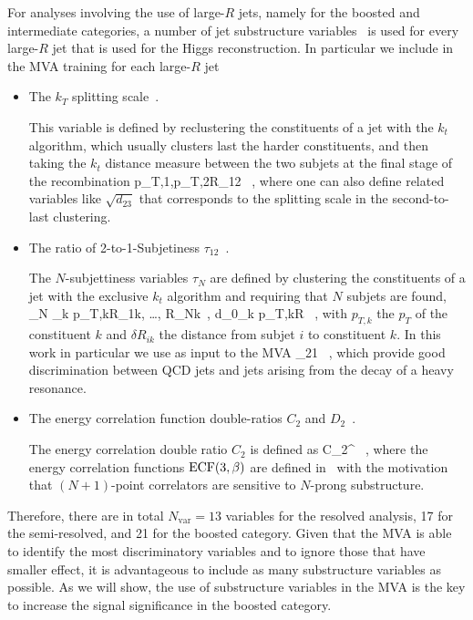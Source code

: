 For analyses involving the use of large-$R$ jets,
namely for the boosted and intermediate categories,
a number of jet substructure variables~\cite{Aad:2013gja} is used
for every large-$R$ jet that is used for the Higgs reconstruction.
%
In particular we include in the MVA training for each large-$R$ jet
\begin{itemize}
\item The $k_T$ splitting scale~\cite{Butterworth:2002tt,Butterworth:2008iy}.

  This variable is defined by reclustering the constituents of a jet with the
  $k_t$ algorithm, which usually clusters last the harder constituents, and then
  taking the $k_t$ distance measure between the two subjets at the final stage of the recombination
  \be
{} \lp p_{T,1},p_{T,2}\rp \cdot \Delta R_{12} \, ,
\ee
where one can also define related variables like $\sqrt{d_{23}}$ that corresponds to the
splitting scale in the second-to-last clustering.
  
\item The ratio of 2-to-1-Subjetiness $\tau_{12}$~\cite{Thaler:2010tr,Thaler:2011gf}.

  The $N$-subjettiness variables $\tau_N$ are defined by clustering the constituents
  of a jet with the exclusive $k_t$ algorithm and requiring that $N$ subjets are found,
  \be
  \tau_N \equiv {} \sum_k p_{T,k}\lp \delta R_{1k}, \ldots,
  \delta R_{Nk}\rp \, , \qquad d_0\equiv \sum_k p_{T,k}\cdot R \, ,
  \ee
  with $ p_{T,k}$ the $p_T$ of the constituent $k$ and $\delta R_{ik}$ the distance from
  subjet $i$ to constituent $k$.
  In this work in particular we use as input to the MVA
  \be
\tau_{21} \equiv {} \, ,
  \ee
  which provide good discrimination between QCD jets and jets arising from the decay of
  a heavy resonance.
  
\item The energy correlation function double-ratios $C_2$ and $D_2$~\cite{Larkoski:2013eya}.

  The energy correlation double ratio $C_2$ is defined
  as
  \be
C_2^{\beta} \equiv {} \, ,
  \ee
  where the energy correlation functions ${\rm ECF}(3,\beta)$ are defined
  in~\cite{Larkoski:2013eya} with the motivation that $(N+1)$-point correlators
  are sensitive to $N$-prong substructure.

\end{itemize}
%
Therefore, there are in total $N_{\mathrm{var}}=13$ variables for the resolved analysis,
17 for the semi-resolved, and 21 for the boosted category.
%
Given that the MVA is able to identify the most discriminatory variables
and to ignore those that have smaller effect, it is advantageous to
include as many substructure variables as possible.
%
As we will show, the use of substructure variables in the MVA is the key to increase the signal
significance in the boosted category.


